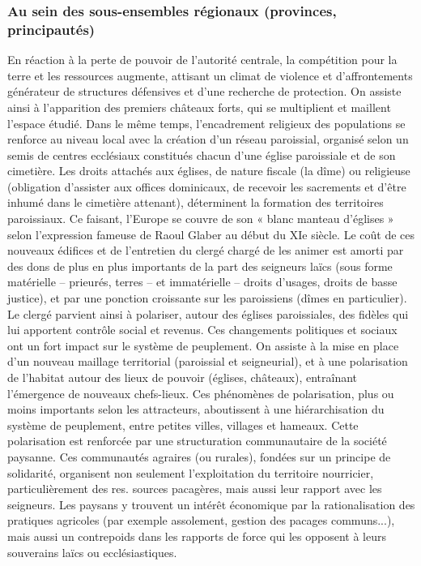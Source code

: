 \documentclass[12pt, a4paper, oneside]{book}
\begin{document}
	
	\subsubsection{Au sein des sous-ensembles régionaux (provinces, principautés)}
	
	En réaction à la perte de pouvoir de l'autorité centrale, la compétition pour la terre et les ressources augmente, attisant un climat de violence et d'affrontements générateur de structures défensives et d'une recherche de protection.
	On assiste ainsi à l'apparition des premiers châteaux forts, qui se multiplient et maillent l'espace étudié.
	Dans le même temps, l'encadrement religieux des populations se renforce au niveau local avec la création d'un réseau paroissial, organisé selon un semis de centres ecclésiaux constitués chacun d'une église paroissiale et de son cimetière.
	Les droits attachés aux églises, de nature fiscale (la dîme) ou religieuse (obligation d'assister aux offices dominicaux, de recevoir les sacrements et d'être inhumé dans le cimetière attenant), déterminent la formation des territoires paroissiaux.
	Ce faisant, l'Europe se couvre de son « blanc manteau d'églises » selon l'expression fameuse de Raoul Glaber au début du XIe siècle.
	Le coût de ces nouveaux édifices et de l'entretien du clergé chargé de les animer est amorti par des dons de plus en plus importants de la part des seigneurs laïcs (sous forme matérielle – prieurés, terres – et immatérielle – droits d'usages, droits de basse justice), et par une ponction croissante sur les  paroissiens (dîmes en particulier).
	Le clergé parvient ainsi à polariser, autour des églises paroissiales, des fidèles qui lui apportent contrôle social et revenus.
	Ces changements politiques et sociaux ont un fort impact sur le système de peuplement.
	On assiste à la mise en place d'un nouveau maillage territorial (paroissial et seigneurial), et à une polarisation de l'habitat autour des lieux de pouvoir (églises, châteaux), entraînant l'émergence de nouveaux chefs-lieux.
	Ces phénomènes de polarisation, plus ou moins importants selon les attracteurs, aboutissent à une hiérarchisation du système de peuplement, entre petites villes, villages et hameaux.
	Cette polarisation est renforcée par une structuration communautaire de la société paysanne.
	Ces communautés agraires (ou rurales), fondées sur un principe de solidarité, organisent non seulement l'exploitation du territoire nourricier, particulièrement des res.
	sources pacagères, mais aussi leur rapport avec les seigneurs.
	Les paysans y trouvent un intérêt économique par la rationalisation des pratiques agricoles (par exemple assolement, gestion des pacages communs...), mais aussi un contrepoids dans les rapports de force qui les opposent à leurs souverains laïcs ou ecclésiastiques.
	
\end{document}
